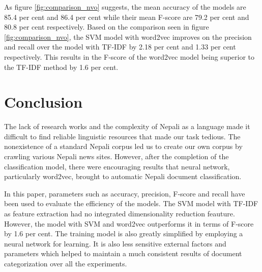 \documentclass[fleqn --11pt --twoside]{IOEGC2016} %
\begin{document}
As figure \ref{fig:comparison_nvo} suggests, the mean accuracy of the models are 85.4 per cent and 86.4 per cent while their mean F-score are 79.2 per cent and 80.8 per cent respectively. Based on the comparison seen in figure \ref{fig:comparison_nvo}, the SVM model with word2vec improves on the precision and recall over the model with TF-IDF by 2.18 per cent and 1.33 per cent respectively. This results in the F-score of the word2vec model being superior to the TF-IDF method by 1.6 per cent.


\section{Conclusion}
The lack of research works and the complexity of Nepali as a language made it difficult to find reliable linguistic resources that made our task tedious. The nonexistence of a standard Nepali corpus led us to create our own corpus by crawling various Nepali news sites. However, after the completion of the classification model, there were encouraging results that neural network, particularly word2vec, brought to automatic Nepali document classification. 
\par
In this paper, parameters such as accuracy, precision, F-score and recall have been used to evaluate the efficiency of the models. The SVM model with TF-IDF as feature extraction had no integrated dimensionality reduction feauture. However, the model with SVM and word2vec outperforms it in terms of F-score by 1.6 per cent. The training model is also greatly simplified by employing a neural network for learning. It is also less sensitive external factors and parameters which helped to maintain a much consistent results of document categorization over all the experiments. 
\end{document}
